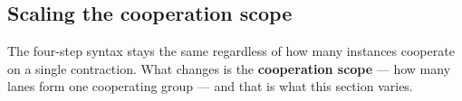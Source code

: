\subsection*{Scaling the cooperation scope}

The four-step syntax stays the same regardless of how many instances cooperate on a single contraction. What changes is the \textbf{cooperation scope} --- how many lanes form one cooperating group --- and that is what this section varies.
